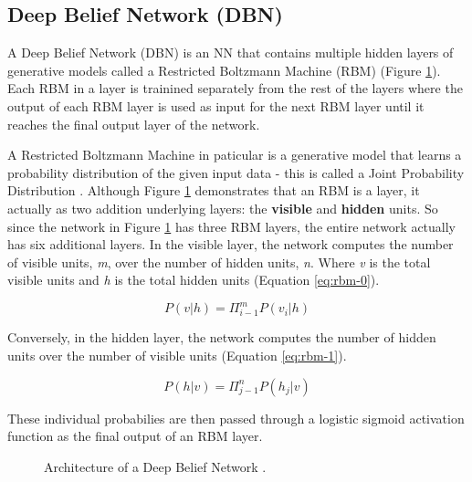 \documentclass[12pt,twocolumn,letterpaper]{article}
\begin{document}
\subsection{Deep Belief Network (DBN)}
\label{sub:deep-belief-network}

A Deep Belief Network (DBN) is an NN that contains multiple hidden layers of generative models called 
a Restricted Boltzmann Machine (RBM) (Figure \ref{fig:dl-4}). Each RBM in a layer is trainined separately 
from the rest of the layers where the output of each RBM layer is used as input for the next RBM layer until 
it reaches the final output layer of the network.

A Restricted Boltzmann Machine in paticular is a generative model that learns a probability distribution 
of the given input data - this is called a Joint Probability Distribution \cite{Feller57}. Although Figure 
\ref{fig:dl-4} demonstrates that an RBM is a layer, it actually as two addition underlying layers: the 
\textbf{visible} and \textbf{hidden} units. So since the network in Figure \ref{fig:dl-4} has three RBM layers, the 
entire network actually has six additional layers. In the visible layer, the network computes the number 
of visible units, \emph{m}, over the number of hidden units, \emph{n}. Where \emph{v} is the total 
visible units and \emph{h} is the total hidden units (Equation \ref{eq:rbm-0}).

\begin{equation}
\label{eq:rbm-0}
    P(v|h)=\Pi_{i-1}^{m}P(v_{i}|h)
\end{equation}

Conversely, in the hidden layer, the network computes the number of hidden units over the number of 
visible units (Equation \ref{eq:rbm-1}).

\begin{equation}
\label{eq:rbm-1}
    P(h|v)=\Pi_{j-1}^{n}P(h_{j}|v)
\end{equation}

These individual probabilies are then passed through a logistic sigmoid activation function as the final 
output of an RBM layer.

\begin{figure}[h]
    \centering
    \caption{Architecture of a Deep Belief Network \cite{Lin20}.}
    \label{fig:dl-4}
\end{figure}
\end{document}
